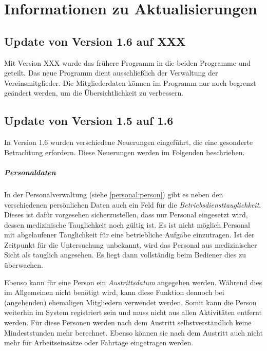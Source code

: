 \chapter{Informationen zu Aktualisierungen}\label{epl:update}
\section{Update von Version 1.6 auf XXX}
\label{epl:update:1.6-XXX}
Mit Version XXX wurde das frühere Programm \Einsatz in die beiden Programme \Einsatz und \Personal geteilt.
Das neue Programm \Personal dient ausschließlich der Verwaltung der Vereinsmitglieder.
Die Mitgliederdaten können im Programm \Einsatz nur noch begrenzt geändert werden, um die Übersichtlichkeit zu verbessern.



\section{Update von Version 1.5 auf 1.6}
\label{epl:update:1.5-1.6}
In Version 1.6 wurden verschiedene Neuerungen eingeführt, die eine gesonderte Betrachtung erfordern.
Diese Neuerungen werden im Folgenden beschrieben.


\paragraph{Personaldaten}
In der Personalverwaltung (siehe \cref{personal:person}) gibt es neben den verschiedenen persönlichen Daten auch ein Feld für die \emph{Betriebsdiensttauglichkeit}.
Dieses ist dafür vorgesehen sicherzustellen, dass nur Personal eingesetzt wird, dessen medizinische Tauglichkeit noch gültig ist.
Es ist nicht möglich Personal mit abgelaufener Tauglichkeit für eine betriebliche Aufgabe einzutragen.
Ist der Zeitpunkt für die Untersuchung unbekannt, wird das Personal aus medizinischer Sicht als tauglich angesehen.
Es liegt dann vollständig beim Bediener dies zu überwachen.

Ebenso kann für eine Person ein \emph{Austrittsdatum} angegeben werden.
Während dies im Allgemeinen nicht benötigt wird, kann diese Funktion dennoch bei (angehenden) ehemaligen Mitgliedern verwendet werden.
Somit kann die Person weiterhin im System registriert sein und muss nicht aus allen Aktivitäten entfernt werden.
Für diese Personen werden nach dem Austritt selbstverständlich keine Mindeststunden mehr berechnet.
Ebenso können sie nach dem Austritt auch nicht mehr für Arbeitseinsätze oder Fahrtage eingetragen werden.

